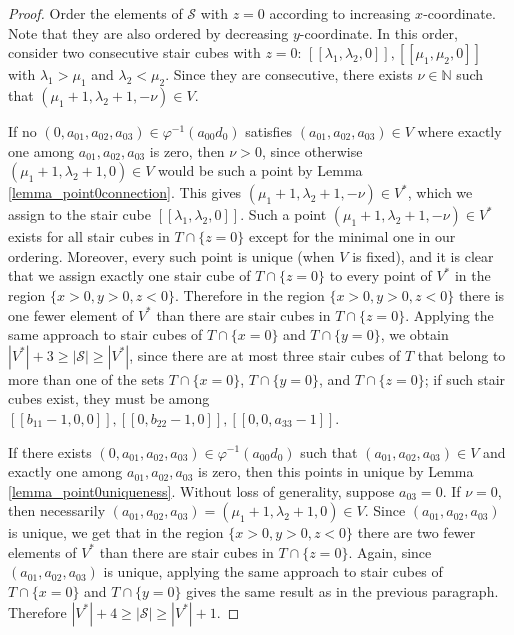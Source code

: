 \documentclass[12pt]{article}
\theoremstyle{remark}
\begin{document}
\begin{proof}
     Order the elements of $\mathcal{S}$ with $z=0$ according to increasing $x$-coordinate. Note that they are also ordered by decreasing $y$-coordinate. In this order, consider two consecutive stair cubes with $z=0$: $[[\lambda_1,\lambda_2,0]], [[\mu_1,\mu_2,0]]$ with $\lambda_1 > \mu_1$ and $\lambda_2 < \mu_2$. Since they are consecutive, there exists $\nu \in \mathbb{N}$ such that $(\mu_1+1,\lambda_2+1,-\nu) \in V$. 

     If no $(0,a_{01},a_{02},a_{03}) \in \varphi^{-1}(a_{00}d_0)$ satisfies $(a_{01},a_{02},a_{03}) \in V$ where exactly one among $a_{01}, a_{02}, a_{03}$ is zero, then $\nu > 0$, since otherwise $(\mu_1+1,\lambda_2+1,0) \in V$ would be such a point by Lemma \ref{lemma_point0connection}. This gives $(\mu_1+1,\lambda_2+1,-\nu) \in V^*$, which we assign to the stair cube $[[\lambda_1,\lambda_2,0]]$. Such a point $(\mu_1+1,\lambda_2+1,-\nu) \in V^*$ exists for all stair cubes in $T \cap \{z = 0\}$ except for the minimal one in our ordering. Moreover, every such point is unique (when $V$ is fixed), and it is clear that we assign exactly one stair cube of $T \cap \{z = 0\}$ to every point of $V^*$ in the region $\{x > 0, y > 0, z < 0\}$.   
     Therefore in the region $\{x > 0, y > 0, z < 0\}$ there is one fewer element of $V^*$ than there are stair cubes in $T \cap \{z = 0\}$. Applying the same approach to stair cubes of $T \cap \{x = 0\}$ and $T \cap \{y = 0\}$, we obtain $|V^*|+3 \geq |\mathcal{S}| \geq |V^*|$, since there are at most three stair cubes of $T$ that belong to more than one of the sets $T \cap \{x = 0\}$, $T \cap \{y = 0\}$, and $T \cap \{z = 0\}$; if such stair cubes exist, they must be among $[[b_{11}-1,0,0]], [[0,b_{22}-1,0]], [[0,0,a_{33}-1]]$.

     If there exists $(0,a_{01},a_{02},a_{03}) \in \varphi^{-1}(a_{00}d_0)$ such that $(a_{01},a_{02},a_{03}) \in V$ and exactly one among $a_{01}, a_{02}, a_{03}$ is zero, then this points in unique by Lemma \ref{lemma_point0uniqueness}. Without loss of generality, suppose $a_{03} = 0$. If $\nu = 0$, then necessarily $(a_{01},a_{02},a_{03}) = (\mu_1+1,\lambda_2+1,0) \in V$. Since $(a_{01},a_{02},a_{03})$ is unique, we get that in the region $\{x > 0, y > 0, z < 0\}$ there are two fewer elements of $V^*$ than there are stair cubes in $T \cap \{z = 0\}$. Again, since $(a_{01},a_{02},a_{03})$ is unique, applying the same approach to stair cubes of $T \cap \{x = 0\}$ and $T \cap \{y = 0\}$ gives the same result as in the previous paragraph. Therefore $|V^*|+4 \geq |\mathcal{S}| \geq |V^*|+1$.  
\end{proof}
\end{document}
